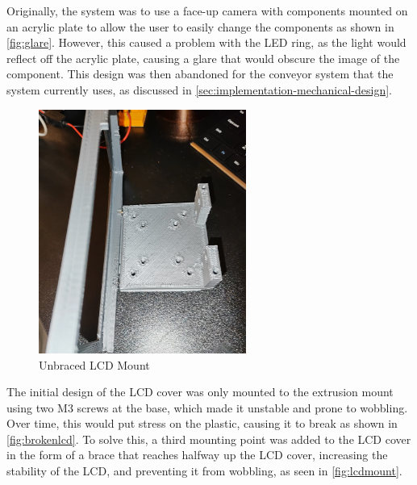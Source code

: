 Originally, the system was to use a face-up camera with components mounted on an acrylic plate to allow the user to easily change the components as shown in \autoref{fig:glare}. However, this caused a problem with the LED ring, as the light would reflect off the acrylic plate, causing a glare that would obscure the image of the component. This design was then abandoned for the conveyor system that the system currently uses, as discussed in \autoref{sec:implementation-mechanical-design}.

\begin{figure}[H]
    \centering
    \includegraphics[height=8cm]{imgs/design/unbracedscreen.jpeg}
    \caption{Unbraced LCD Mount}
    \label{fig:brokenlcd}
  \end{figure}

 The initial design of the LCD cover was only mounted to the extrusion mount using two M3 screws at the base, which made it unstable and prone to wobbling. Over time, this would put stress on the plastic, causing it to break as shown in \autoref{fig:brokenlcd}. To solve this, a third mounting point was added to the LCD cover in the form of a brace that reaches halfway up the LCD cover, increasing the stability of the LCD, and preventing it from wobbling, as seen in \autoref{fig:lcdmount}.

